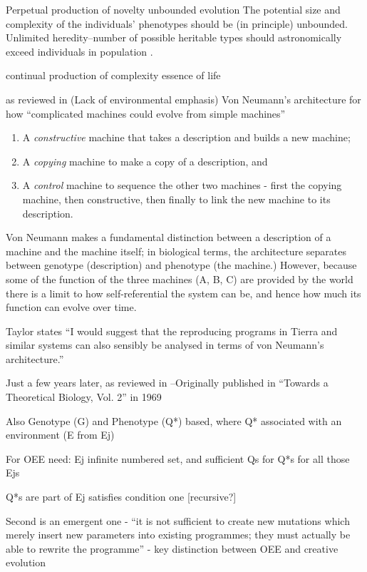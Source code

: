 \begin{NOTES}
Perpetual production of novelty
unbounded evolution
The potential size and complexity of the individuals' phenotypes should be (in principle) unbounded.  \parencite{Soros2014}
Unlimited heredity--number of possible heritable types should astronomically exceed individuals in population \parencite{Vasas2015}.

continual production of complexity
essence of life

\autocite{VonNeumann1966} as reviewed in \autocite{Taylor1999} (Lack of environmental emphasis)
Von Neumann's architecture for how ``complicated machines could evolve from simple machines''

\begin{enumerate}[label=\Alph*]
	\item A \emph{constructive} machine that takes a description and builds a new machine;
	\item A \emph{copying} machine to make a copy of a description, and 
	\item A \emph{control} machine to sequence the other two machines - first the copying machine, then constructive, then finally to link the new machine to its description.
\end{enumerate}

Von Neumann makes a fundamental distinction between a description of a machine and the machine itself; in biological terms, the architecture separates between genotype (description) and phenotype (the machine.) However, because some of the function of the three machines (A, B, C) are provided by the world there is a limit to how self-referential the system can be, and hence how much its function can evolve over time.

Taylor states ``I would suggest that the reproducing programs in Tierra and similar systems can also sensibly be analysed in terms of von Neumann's architecture.''

Just a few years later, \autocite{Waddington2008} as reviewed in \autocite{Taylor:1999sc}--Originally published in ``Towards a Theoretical Biology, Vol. 2'' in 1969

Also Genotype (G) and Phenotype (Q*) based, where Q* associated with an environment (E from Ej)

For OEE need: Ej infinite numbered set, and sufficient Qs for Q*s for all those Ejs

Q*s are part of Ej satisfies condition one {[}recursive?{]}

Second is an emergent one - ``it is not sufficient to create new mutations which merely insert new parameters into existing programmes; they must actually be able to rewrite the programme''
- key distinction between OEE and creative evolution


\end{NOTES}
